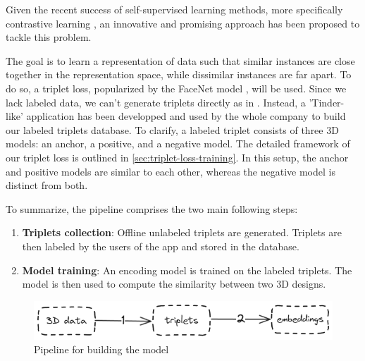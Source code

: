 Given the recent success of self-supervised learning methods, more specifically contrastive learning \cite{radfordLearningTransferableVisual2021,yuPointBERTPretraining3D2022,liuOpenShapeScaling3D2023}, an innovative and promising approach has been proposed to tackle this problem.

The goal is to learn a representation of data such that similar instances are close together in the representation space, while dissimilar instances are far apart. To do so, a triplet loss, popularized by the FaceNet model \cite{schroffFaceNetUnifiedEmbedding2015}, will be used. Since we lack labeled data, we can't generate triplets directly as in \cite{schroffFaceNetUnifiedEmbedding2015}. Instead, a 'Tinder-like' application has been developped and used by the whole company to build our labeled triplets database. To clarify, a labeled triplet consists of three 3D models: an anchor, a positive, and a negative model. The detailed framework of our triplet loss is outlined in \autoref{sec:triplet-loss-training}. In this setup, the anchor and positive models are similar to each other, whereas the negative model is distinct from both.

To summarize, the pipeline comprises the two main following steps:
\begin{enumerate}
    \item \textbf{Triplets collection}: Offline unlabeled triplets are generated. Triplets are then labeled by the users of the app and stored in the database.
    \item \textbf{Model training}: An encoding model is trained on the labeled triplets. The model is then used to compute the similarity between two 3D designs.
\end{enumerate}

\begin{figure}[]
    \centering
    \includegraphics[width=0.8\columnwidth]{images/steps.png}
    \caption{Pipeline for building the model}   
    \label{fig:steps}
\end{figure}